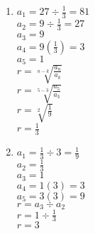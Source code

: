 \begin{multicols}{2}
\begin{enumerate}[label = \arabic*. ]
\item %
$a_1=27\div \displaystyle \frac{1}{3}=81$\\
$a_2=9\div \displaystyle \frac{1}{3}=27$\\
$a_3=9$\\
$a_4=9\left(\displaystyle \frac{1}{3} \right) =3$\\
$a_5=1$\\
$r=\sqrt[n-k]{\displaystyle \frac{a_n}{a_k}} $\\
$r=\sqrt[5-3]{\displaystyle \frac{a_5}{a_3}} $\\
$r=\sqrt[2]{\displaystyle \frac{1}{9}} $\\
$r=\displaystyle \frac{1}{3}$\\

\item %
$a_1=\displaystyle \frac{1}{3}\div 3=\displaystyle \frac{1}{9}$\\
$a_2=\displaystyle \frac{1}{3}$\\
$a_3=1$\\
$a_4=1(3)=3$\\
$a_5=3(3)=9$\\
$r=a_3 \div a_2 $\\
$r=1 \div \displaystyle \frac{1}{3} $\\
$r=3 $\\



\end{enumerate}
\end{multicols} 